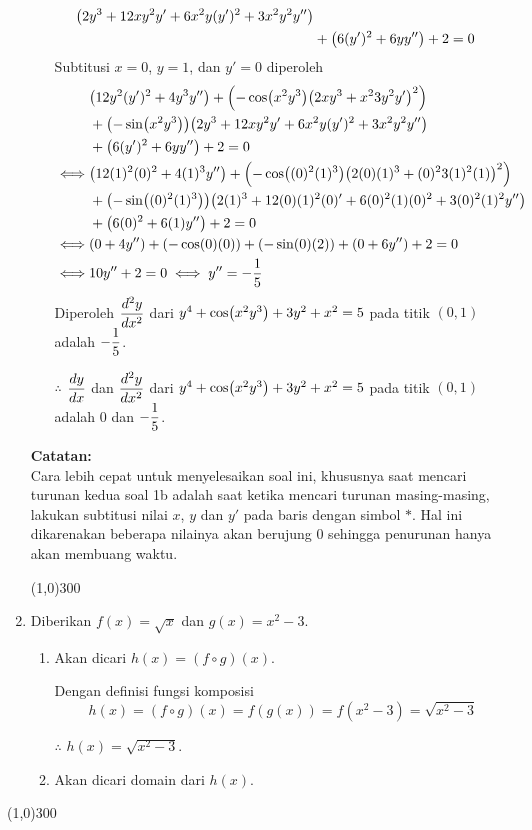 \begin{enumerate}[leftmargin=*, label={\arabic*}.]
\begin{enumerate}[label={\alph*}.]
\begin{align*}
        \bracket*{2y^{3}+12xy^{2}y'+6x^{2}y(y')^{2}+3x^{2}y^{2}y''}\\
        &+\bracket*{6(y')^{2}+6yy''} + 2 = 0
    \end{align*}
    Subtitusi $x=0$, $y=1$, dan $y'=0$ diperoleh
    \begin{align*}
        &\bracket*{12y^{2}(y')^{2}+4y^{3}y''}
        +\bracket*{-\cos\bracket*{x^{2}y^{3}}\bracket*{2xy^{3}+x^{2}3y^{2}y'}^{2}}
        \\&+\bracket*{-\sin\bracket*{x^{2}y^{3}}}
        \bracket*{2y^{3}+12xy^{2}y'+6x^{2}y(y')^{2}+3x^{2}y^{2}y''}\\
        &+\bracket*{6(y')^{2}+6yy''} + 2 = 0\\
        \iff &\bracket*{12(1)^{2}(0)^{2}+4(1)^{3}y''}
        +\bracket*{-\cos\bracket*{(0)^{2}(1)^{3}}\bracket*{2(0)(1)^{3}+(0)^{2}3(1)^{2}(1)}^{2}}
        \\&+\bracket*{-\sin\bracket*{(0)^{2}(1)^{3}}}
        \bracket*{2(1)^{3}+12(0)(1)^{2}(0)'+6(0)^{2}(1)(0)^{2}+3(0)^{2}(1)^{2}y''}\\
        &+\bracket*{6(0)^{2}+6(1)y''} + 2 = 0\\
        \iff &(0+4y'')+(-\cos(0)(0))+(-\sin(0)(2))+(0+6y'')+2=0\\
        \iff &10y''+2=0 \iff y'' = -\frac{1}{5}
    \end{align*}
    Diperoleh $\ds\frac{d^{2}y}{dx^{2}}$ dari 
    $y^{4}+\cos\bracket*{x^{2}y^{3}}+3y^{2}+x^{2}=5$ pada titik $(0,1)$ adalah $\ds-\frac{1}{5}$.
    
    $\therefore$ $\ds\frac{dy}{dx}$ dan $\ds\frac{d^{2}y}{dx^{2}}$ dari 
    $y^{4}+\cos\bracket*{x^{2}y^{3}}+3y^{2}+x^{2}=5$ pada titik $(0,1)$ adalah $0$ dan $\ds-\frac{1}{5}$.
\end{enumerate}
\vspace{0.1cm}
\textbf{Catatan:}\\
Cara lebih cepat untuk menyelesaikan soal ini, khususnya saat mencari 
turunan kedua soal 1b adalah saat ketika mencari turunan masing-masing, 
lakukan subtitusi nilai $x$, $y$ dan $y'$ pada baris dengan simbol $*$. 
Hal ini dikarenakan beberapa nilainya akan berujung $0$ sehingga penurunan 
hanya akan membuang waktu.
\begin{center}
    \line(1,0){300}
\end{center}
\item Diberikan $f(x)=\sqrt{x}$ dan $g(x)=x^{2}-3$.
\begin{enumerate}[label={\alph*}.]
    \item Akan dicari $h(x)=(f \circ g)(x)$.
    
    Dengan definisi fungsi komposisi
    \[
    h(x)=(f \circ g)(x)=f(g(x))=f(x^{2}-3) = \sqrt{x^{2}-3}
    \]

    $\therefore$ $h(x) = \sqrt{x^{2}-3}$.

    \item Akan dicari domain dari $h(x)$.
\end{enumerate}

\end{enumerate}

\begin{center}
    \line(1,0){300}
\end{center}